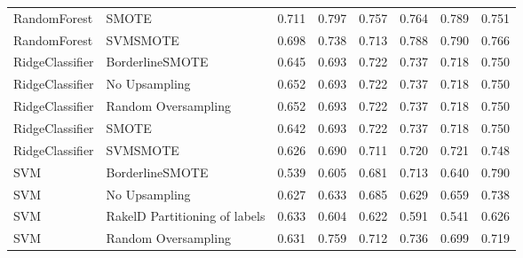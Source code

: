 \begin{tabular}{llllllll}
                   RandomForest &                         SMOTE & 0.711 &                     0.797 &                 0.757 &                  0.764 &                                   0.789 &    0.751 \\
                   RandomForest &                      SVMSMOTE & 0.698 &                     0.738 &                 0.713 &                  0.788 &                                   0.790 &    0.766 \\
                RidgeClassifier &               BorderlineSMOTE & 0.645 &                     0.693 &                 0.722 &                  0.737 &                                   0.718 &    0.750 \\
                RidgeClassifier &                 No Upsampling & 0.652 &                     0.693 &                 0.722 &                  0.737 &                                   0.718 &    0.750 \\
                RidgeClassifier &           Random Oversampling & 0.652 &                     0.693 &                 0.722 &                  0.737 &                                   0.718 &    0.750 \\
                RidgeClassifier &                         SMOTE & 0.642 &                     0.693 &                 0.722 &                  0.737 &                                   0.718 &    0.750 \\
                RidgeClassifier &                      SVMSMOTE & 0.626 &                     0.690 &                 0.711 &                  0.720 &                                   0.721 &    0.748 \\
                            SVM &               BorderlineSMOTE & 0.539 &                     0.605 &                 0.681 &                  0.713 &                                   0.640 &    0.790 \\
                            SVM &                 No Upsampling & 0.627 &                     0.633 &                 0.685 &                  0.629 &                                   0.659 &    0.738 \\
                            SVM & RakelD Partitioning of labels & 0.633 &                     0.604 &                 0.622 &                  0.591 &                                   0.541 &    0.626 \\
                            SVM &           Random Oversampling & 0.631 &                     0.759 &                 0.712 &                  0.736 &                                   0.699 &    0.719 \\

\end{tabular}
